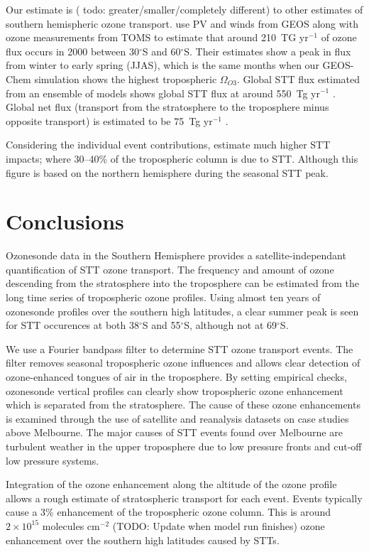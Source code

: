 \documentclass{article}
\begin{document}
  Our estimate is ( todo: greater/smaller/completely different) to other estimates of southern hemispheric ozone transport. 
  \citet{Olsen2003} use PV and winds from GEOS along with ozone measurements from TOMS to estimate that around 210~TG yr$^{-1}$ of ozone flux occurs in 2000 between 30$^{\circ}$S and 60$^{\circ}$S.
  Their estimates show a peak in flux from winter to early spring (JJAS), which is the same months when our GEOS-Chem simulation shows the highest tropospheric $\Omega_{O3}$.
  Global STT flux estimated from an ensemble of models shows global STT flux at around 550~Tg yr$^{-1}$ \citep{Stevenson2006}.
  Global net flux (transport from the stratosphere to the troposphere minus opposite transport) is estimated to be 75~Tg yr$^{-1}$ \citep{Sprenger2003}.
  
  Considering the individual event contributions, \citet{Terao2008} estimate much higher STT impacts; where 30--40\% of the tropospheric column is due to STT. 
  Although this figure is based on the northern hemisphere during the seasonal STT peak.
  
  
\section{Conclusions}
  
  Ozonesonde data in the Southern Hemisphere provides a satellite-independant quantification of STT ozone transport.
  The frequency and amount of ozone descending from the stratosphere into the troposphere can be estimated from the long time series of tropospheric ozone profiles.
  Using almost ten years of ozonesonde profiles over the southern high latitudes, a clear summer peak is seen for STT occurences at both 38$^{\circ}$S and 55$^{\circ}$S, although not at 69$^{\circ}$S.
  
  We use a Fourier bandpass filter to determine STT ozone transport events.
  The filter removes seasonal tropospheric ozone influences and allows clear detection of ozone-enhanced tongues of air in the troposphere.
  By setting empirical checks, ozonesonde vertical profiles can clearly show tropospheric ozone enhancement which is separated from the stratosphere.
  The cause of these ozone enhancements is examined through the use of satellite and reanalysis datasets on case studies above Melbourne.
  The major causes of STT events found over Melbourne are turbulent weather in the upper troposphere due to low pressure fronts and cut-off low pressure systems.
  
  Integration of the ozone enhancement along the altitude of the ozone profile allows a rough estimate of stratospheric transport for each event.
  Events typically cause a 3\% enhancement of the tropospheric ozone column.
  This is around $2 \times 10^{15}$ molecules cm$^{-2}$ (TODO: Update when model run finishes) ozone enhancement over the southern high latitudes caused by STTs.
  
\end{document}
